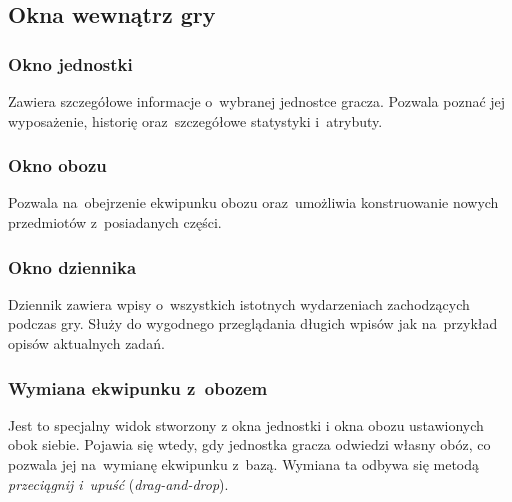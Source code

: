 \documentclass[licencjacka]{pracamgr}
\begin{document}
    \subsection{Okna wewnątrz gry}
      \subsubsection{Okno jednostki}
        Zawiera szczegółowe informacje o~wybranej jednostce gracza. Pozwala poznać jej wyposażenie, historię
        oraz~szczegółowe statystyki i~atrybuty.

      \subsubsection{Okno obozu}
        Pozwala na~obejrzenie ekwipunku obozu oraz~umożliwia konstruowanie nowych przedmiotów z~posiadanych części.

      \subsubsection{Okno dziennika}
        Dziennik zawiera wpisy o~wszystkich istotnych wydarzeniach zachodzących podczas gry. Służy do wygodnego
        przeglądania długich wpisów jak na~przykład opisów aktualnych zadań.

      \subsubsection{Wymiana ekwipunku z~obozem}
        Jest to specjalny widok stworzony z okna jednostki i okna obozu ustawionych obok siebie. Pojawia się wtedy,
        gdy jednostka gracza odwiedzi własny obóz, co pozwala jej na~wymianę ekwipunku z~bazą. Wymiana ta odbywa się
        metodą \emph{przeciągnij i~upuść} (\emph{drag-and-drop}).
        
\end{document}

